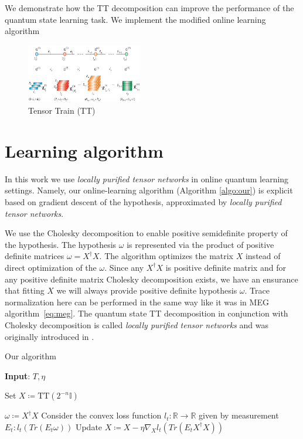 \documentclass[%
 reprint,
 amsmath,amssymb,
 aps,
]{revtex4-2}
\begin{document}
We demonstrate how the TT decomposition can improve the performance of the quantum state learning task. We implement the modified online learning algorithm  

\begin{figure}
    \centering
    \includegraphics[width=0.45\textwidth]{img/tensor_train.png}
    \caption{Tensor Train (TT) \cite{tensorTrains, tensorTrainsOs}}
    \label{fig:tensor_trains}
\end{figure}

\section{\label{sec:algo}Learning algorithm}

In this work we use {\itshape locally purified tensor networks} in online quantum learning settings. Namely, our online-learning algorithm (Algorithm \ref{algo:our}) is explicit based on gradient descent of the hypothesis, approximated by {\itshape locally purified tensor networks}.

We use the Cholesky decomposition to enable positive semidefinite property of the hypothesis. The hypothesis $\omega$ is represented via the product of positive definite matrices $\omega = X^\dagger X$. The algorithm optimizes the matrix $X$ instead of direct optimization of the $\omega$. Since any $X^\dagger X$ is positive definite matrix and for any positive definite matrix Cholesky decomposition exists, we have an ensurance that fitting $X$ we will always provide positive definite hypothesis $\omega$. Trace normalization here can be performed in the same way like it was in MEG algorithm~\eqref{eq:meg}. The quantum state TT decomposition in conjunction with Cholesky decomposition is called {\itshape locally purified tensor networks} and was originally introduced in \cite{Werner_2016}.

\begin{algorithm}
\caption{Our algorithm\\}
\hspace*{\algorithmicindent} \textbf{Input}: $T,\eta$ \\
\begin{algorithmic}[1]
\State Set $X\coloneqq \text{TT}(2^{-n}\mathbb{I})$

    \State $\omega \coloneqq X^\dagger X$
    \State Consider the convex loss function $l_t : \mathbb{R} \rightarrow \mathbb{R}$ given by measurement $E_t : l_t(Tr(E_t\omega))$
    \State Update $X\coloneqq X-\eta\nabla_X l_t(Tr(E_t X^\dagger X))$
\EndFor

\end{algorithmic}
\label{algo:our}
\end{algorithm}
\end{document}
